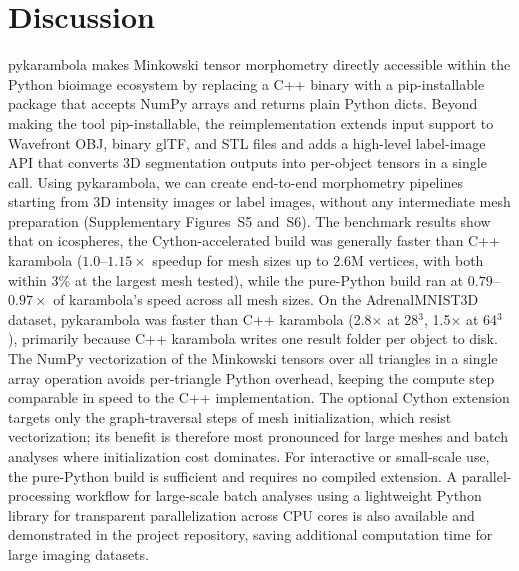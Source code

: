 \documentclass[unnumsec,webpdf,contemporary,large,namedate]{oup-authoring-template}
\begin{document}
\section{Discussion}
pykarambola makes Minkowski tensor morphometry directly accessible within the Python bioimage ecosystem by replacing a C++ binary with a pip-installable package that accepts NumPy arrays and returns plain Python dicts.
Beyond making the tool pip-installable, the reimplementation extends input support to Wavefront OBJ, binary glTF, and STL files and adds a high-level label-image API that converts 3D segmentation outputs into per-object tensors in a single call.
Using pykarambola, we can create end-to-end morphometry pipelines starting from 3D intensity images or label images, without any intermediate mesh preparation (Supplementary Figures~S5 and~S6).
The benchmark results show that on icospheres, the Cython-accelerated build was generally faster than C++ karambola ($1.0$--$1.15\times$ speedup for mesh sizes up to 2.6M vertices, with both within 3\% at the largest mesh tested), while the pure-Python build ran at $0.79$--$0.97\times$ of karambola's speed across all mesh sizes.
On the AdrenalMNIST3D dataset, pykarambola was faster than C++ karambola (2.8$\times$ at 28$^3$, 1.5$\times$ at 64$^3$), primarily because C++ karambola writes one result folder per object to disk.
The NumPy vectorization of the Minkowski tensors over all triangles in a single array operation avoids per-triangle Python overhead, keeping the compute step comparable in speed to the C++ implementation.
The optional Cython extension targets only the graph-traversal steps of mesh initialization, which resist vectorization; its benefit is therefore most pronounced for large meshes and batch analyses where initialization cost dominates.
For interactive or small-scale use, the pure-Python build is sufficient and requires no compiled extension.
A parallel-processing workflow for large-scale batch analyses using a lightweight Python library for transparent parallelization across CPU cores is also available and demonstrated in the project repository, saving additional computation time for large imaging datasets.
\end{document}
